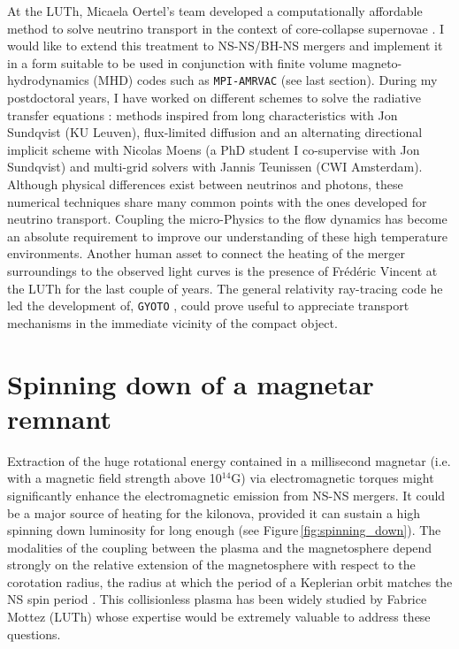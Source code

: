 \documentclass[12pt,onecolumn]{article}
\makeatletter
\newcommand{\mhd}{MHD\xspace}
\newcommand*{\ns}{NS\@\xspace}
\newcommand*{\bh}{BH\@\xspace}
\newcommand*{\eg}{e.g.\@\xspace}
\newcommand*{\ie}{i.e.\@\xspace}
\makeatother
\begin{document}
At the LUTh, Micaela Oertel's team developed a computationally affordable method to solve neutrino transport in the context of core-collapse supernovae \citep{Peres2011}. I would like to extend this treatment to \ns-\ns/\bh-\ns mergers and implement it in a form suitable to be used in conjunction with finite volume magneto-hydrodynamics (\mhd) codes such as \texttt{MPI-AMRVAC} (see last section). During my postdoctoral years, I have worked on different schemes to solve the radiative transfer equations : methods inspired from long characteristics with Jon Sundqvist (KU Leuven), flux-limited diffusion and an alternating directional implicit scheme with Nicolas Moens (a PhD student I co-supervise with Jon Sundqvist) and multi-grid solvers with Jannis Teunissen (CWI Amsterdam). Although physical differences exist between neutrinos and photons, these numerical techniques share many common points with the ones developed for neutrino transport. Coupling the micro-Physics to the flow dynamics has become an absolute requirement to improve our understanding of these high temperature environments. Another human asset to connect the heating of the merger surroundings to the observed light curves is the presence of Fr\'{e}d\'{e}ric Vincent at the LUTh for the last couple of years. The general relativity ray-tracing code he led the development of, \texttt{GYOTO} \citep{Vincent2011}, could prove useful to appreciate transport mechanisms in the immediate vicinity of the compact object.

\section{Spinning down of a magnetar remnant}

Extraction of the huge rotational energy contained in a millisecond magnetar (\ie with a magnetic field strength above 10$^{14}$G) via electromagnetic torques might significantly enhance the electromagnetic emission from \ns-\ns mergers. It could be a major source of heating for the kilonova, provided it can sustain a high spinning down luminosity for long enough (see Figure\,\ref{fig:spinning_down}). The modalities of the coupling between the plasma and the magnetosphere depend strongly on the relative extension of the magnetosphere with respect to the corotation radius, the radius at which the period of a Keplerian orbit matches the \ns spin period \citep[see \eg the propeller effect described in][]{Bozzo2008}. This collisionless plasma has been widely studied by Fabrice Mottez (LUTh) whose expertise would be extremely valuable to address these questions. 
\end{document}
